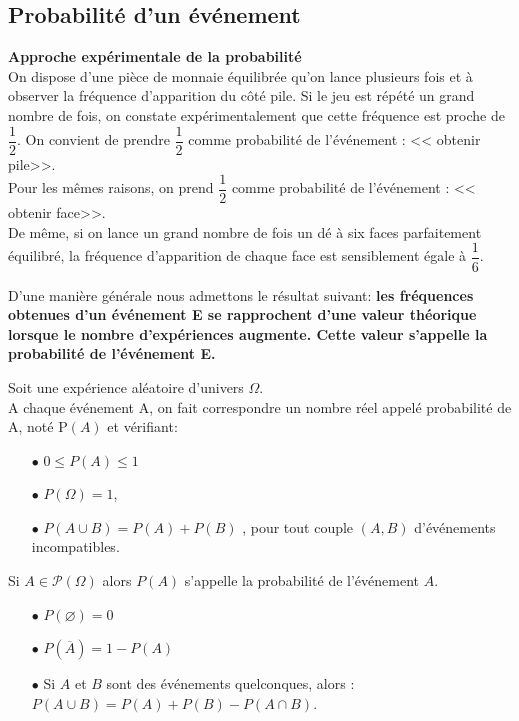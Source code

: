  
\subsection{Probabilité d'un événement}
  \textbf{ Approche expérimentale de la probabilité}\\
On dispose d'une pièce de monnaie équilibrée qu'on lance plusieurs fois  et à observer la fréquence d'apparition du côté pile. Si le jeu est répété un grand nombre de fois, on constate expérimentalement que cette fréquence est proche de $ \dfrac{1}{2} $. On convient de prendre  $ \dfrac{1}{2} $  comme probabilité de l'événement   : << obtenir pile>>. \\ Pour les mêmes raisons, on prend  $ \dfrac{1}{2} $  comme probabilité de l'événement   : << obtenir face>>. \\
De même, si on lance un grand nombre de fois un dé à six faces parfaitement équilibré, la 
fréquence d'apparition de chaque face est sensiblement égale à  $ \dfrac{1}{6} $.


D'une manière générale  nous admettons le  résultat suivant: \textbf{les fréquences obtenues d'un événement E se rapprochent d'une valeur théorique lorsque le nombre d'expériences augmente. Cette valeur s'appelle la probabilité de l'événement E.}

\begin{definition}
Soit  une expérience aléatoire d'univers $ \Omega $.\\ A chaque événement A,  on fait correspondre  un  nombre  réel appelé  probabilité de A, noté P$ (A) $  et vérifiant:
\begin{itemize}
\item[$  \bullet$] $ 0\leq P(A)\leq1 $
\item[$  \bullet$] $  P(\Omega)=1 $,
\item[$  \bullet$] $ P(A\cup B)=P(A)+ P(B) $ , pour tout couple $(A, B)$  d'événements incompatibles.

\end{itemize}
 

Si $ A\in  \mathcal{P}(\Omega) $  alors  $ P(A) $ s'appelle la probabilité de l'événement $ A. $

\end{definition}

  
  \bigskip
  
\begin{property}
\begin{itemize}
\item[$  \bullet$] $ P(\varnothing)=0 $
\item[$  \bullet$] $ P(\overline{A} )=1-P(A)$
\item[$  \bullet$] Si  $A$ et $ B$ sont des  événements quelconques, alors :\\
$ P(A\cup B)=P(A)+ P(B)-P(A\cap B) $.
\end{itemize}
\end{property}

